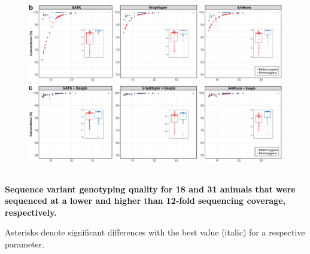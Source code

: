 \documentclass[../main.tex]{subfiles}
\begin{document}
\begin{flushleft}
\begin{landscape}
    \begin{figure}[!htb]
        \centering
        \includegraphics[width=1.5\textwidth]{paper1/supplement/sp3b.pdf}
        \includegraphics[width=1.5\textwidth]{paper1/supplement/sp3c.pdf}
    \end{figure}

\newpage


\subsection{}
\label{supp_mat:24}
\textbf{\large{Sequence variant genotyping quality for 18 and 31 animals that were sequenced at a lower and higher than 12-fold sequencing coverage, respectively.}}

Asterisks denote significant differences with the best value (italic) for a respective parameter.

\bigskip
\bigskip
\bigskip


\end{landscape}
\end{flushleft}
\end{document}
